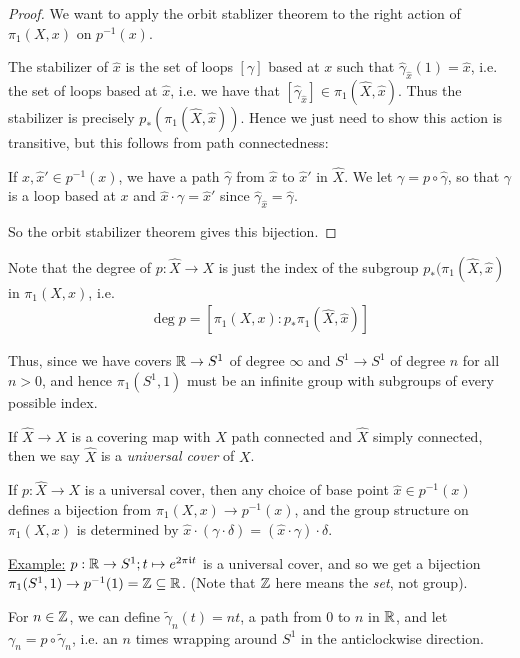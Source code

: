 \documentclass[10pt,a4paper]{article}
\begin{document}
\begin{proof}
We want to apply the orbit stablizer theorem to the right action of $\pi_1(X,x)$ on $p^{-1}(x)$. 

The stabilizer of $\hat{x}$ is the set of loops $[\gamma]$ based at $x$ such that $\hat{\gamma}_{\hat{x}}(1) = \hat{x}$, i.e. the set of loops based at $\hat{x}$, i.e. we have that $[\hat{\gamma}_{\hat{x}}]\in \pi_1(\hat{X},\hat{x})$. Thus the stabilizer is precisely $p_{\ast} (\pi_1(\hat{X},\hat{x}))$. Hence we just need to show this action is transitive, but this follows from path connectedness:

If $\hat{x}, \hat{x}' \in p^{-1}(x)$, we have a path $\hat{\gamma}$ from $\hat{x}$ to $\hat{x}'$ in $\hat{X}$. We let $\gamma = p \circ \hat{\gamma}$, so that $\gamma$ is a loop based at $x$ and $\hat{x}\cdot \gamma = \hat{x}'$ since $\hat{\gamma}_{\hat{x}} = \hat{\gamma}$.

So the orbit stabilizer theorem gives this bijection.
\end{proof}

Note that the degree of $p:\hat{X} \to X$ is just the index of the subgroup $p_\ast(\pi_1(\hat{X},\hat{x})$ in $\pi_1(X,x)$, i.e.
\begin{align*}
\deg p = [\pi_1(X,x) : p_\ast \pi_1(\hat{X}, \hat{x})]
\end{align*}

Thus, since we have covers $\mathbb{R} \to S^1$ of degree $\infty$ and $S^1 \to S^1$ of degree $n$ for all $n > 0$, and hence $\pi_1(S^1, 1)$ must be an infinite group with subgroups of every possible index.

If $\hat{X} \to X$ is a covering map with $X$ path connected and $\hat{X}$ simply connected, then we say $\hat{X}$ is a \emph{universal cover} of $X$.

\begin{corollary}
If $p:\hat{X} \to X$ is a universal cover, then any choice of base point $\hat{x} \in p^{-1}(x)$ defines a bijection from $\pi_1(X,x) \to p^{-1}(x)$, and the group structure on $\pi_1(X,x)$ is determined by $\hat{x}\cdot(\gamma\cdot \delta) = (\hat{x}\cdot \gamma)\cdot \delta$.
\end{corollary}

\underline{Example:} $p:\mathbb{R}\to S^1; t \mapsto e^{2\pi\mathfrak{i} t}$ is a universal cover, and so we get a bijection $\pi_1(S^1,1) \to p^{-1}(1) = \mathbb{Z} \subseteq \mathbb{R}$. (Note that $\mathbb{Z}$ here means the \textit{set}, not group).

For $n\in \mathbb{Z}$, we can define $\tilde{\gamma}_n(t) = nt$, a path from $0$ to $n$ in $\mathbb{R}$, and let $\gamma_n = p\circ \tilde{\gamma}_n$, i.e. an $n$ times wrapping around $S^1$ in the anticlockwise direction.
\end{document}
